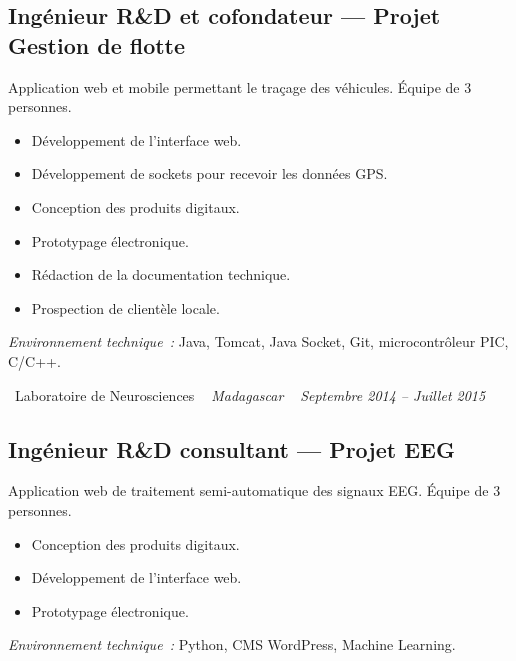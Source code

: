 \documentclass[10pt,a4paper]{article}
\begin{document}
\subsection*{Ingénieur R\&D et cofondateur --- Projet Gestion de flotte}
\color{darkgray}
Application web et mobile permettant le traçage des véhicules. Équipe de 3 personnes.
\begin{itemize}
  \item Développement de l'interface web.
  \item Développement de sockets pour recevoir les données GPS.
  \item Conception des produits digitaux.
  \item Prototypage électronique.
  \item Rédaction de la documentation technique.
  \item Prospection de clientèle locale.
\end{itemize}
\textit{Environnement technique~:} Java, Tomcat, Java Socket, Git, microcontrôleur PIC, C/C++.

\vspace{10pt}

\noindent\textcolor{primary}{ \faBuilding\ Laboratoire de Neurosciences} \quad
\textit{ \small \textcolor{darkgray}{ \faMapMarker\ } Madagascar } \hfill
\textit{ \small \textcolor{darkgray}{ \faCalendar\ } Septembre 2014 -- Juillet 2015 }

\vspace{4pt}

\subsection*{Ingénieur R\&D consultant --- Projet EEG}
\color{darkgray}
Application web de traitement semi-automatique des signaux EEG. Équipe de 3 personnes.
\begin{itemize}
  \item Conception des produits digitaux.
  \item Développement de l'interface web.
  \item Prototypage électronique.
\end{itemize}
\textit{Environnement technique~:} Python, CMS WordPress, Machine Learning.

\vspace{14pt}
\end{document}

